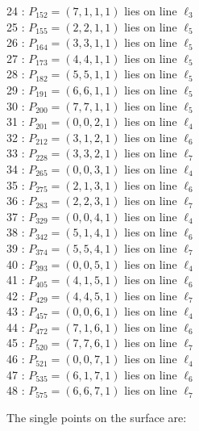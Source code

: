 \documentclass{article}
\begin{document}
{\begin{multicols}{2}
24 : $P_{152}=( 7, 1, 1, 1 )$ lies on line $\ell_{3}$\\
25 : $P_{155}=( 2, 2, 1, 1 )$ lies on line $\ell_{5}$\\
26 : $P_{164}=( 3, 3, 1, 1 )$ lies on line $\ell_{5}$\\
27 : $P_{173}=( 4, 4, 1, 1 )$ lies on line $\ell_{5}$\\
28 : $P_{182}=( 5, 5, 1, 1 )$ lies on line $\ell_{5}$\\
29 : $P_{191}=( 6, 6, 1, 1 )$ lies on line $\ell_{5}$\\
30 : $P_{200}=( 7, 7, 1, 1 )$ lies on line $\ell_{5}$\\
31 : $P_{201}=( 0, 0, 2, 1 )$ lies on line $\ell_{4}$\\
32 : $P_{212}=( 3, 1, 2, 1 )$ lies on line $\ell_{6}$\\
33 : $P_{228}=( 3, 3, 2, 1 )$ lies on line $\ell_{7}$\\
34 : $P_{265}=( 0, 0, 3, 1 )$ lies on line $\ell_{4}$\\
35 : $P_{275}=( 2, 1, 3, 1 )$ lies on line $\ell_{6}$\\
36 : $P_{283}=( 2, 2, 3, 1 )$ lies on line $\ell_{7}$\\
37 : $P_{329}=( 0, 0, 4, 1 )$ lies on line $\ell_{4}$\\
38 : $P_{342}=( 5, 1, 4, 1 )$ lies on line $\ell_{6}$\\
39 : $P_{374}=( 5, 5, 4, 1 )$ lies on line $\ell_{7}$\\
40 : $P_{393}=( 0, 0, 5, 1 )$ lies on line $\ell_{4}$\\
41 : $P_{405}=( 4, 1, 5, 1 )$ lies on line $\ell_{6}$\\
42 : $P_{429}=( 4, 4, 5, 1 )$ lies on line $\ell_{7}$\\
43 : $P_{457}=( 0, 0, 6, 1 )$ lies on line $\ell_{4}$\\
44 : $P_{472}=( 7, 1, 6, 1 )$ lies on line $\ell_{6}$\\
45 : $P_{520}=( 7, 7, 6, 1 )$ lies on line $\ell_{7}$\\
46 : $P_{521}=( 0, 0, 7, 1 )$ lies on line $\ell_{4}$\\
47 : $P_{535}=( 6, 1, 7, 1 )$ lies on line $\ell_{6}$\\
48 : $P_{575}=( 6, 6, 7, 1 )$ lies on line $\ell_{7}$\\
\end{multicols}
The single points on the surface are:\\
}
\end{document}
